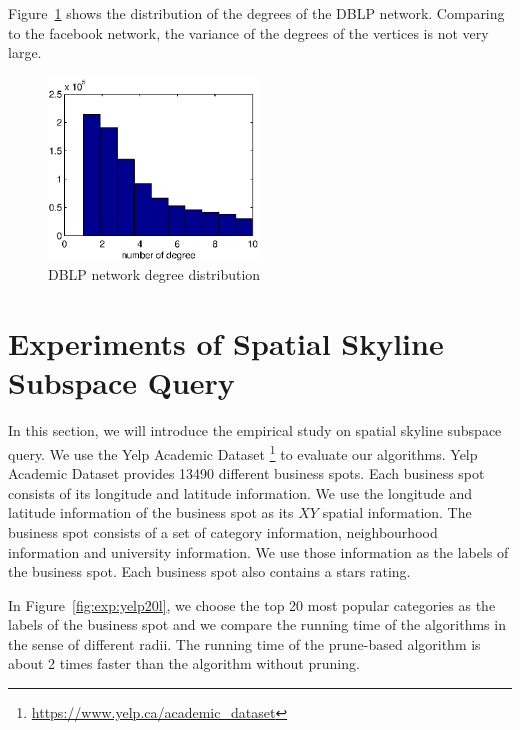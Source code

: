 Figure~\ref{fig:exp:dblp_dis} shows the distribution of the degrees of the DBLP network. Comparing to the facebook network, the variance of the degrees of the vertices is not very large.

\begin{figure}[H]
    \centering
      \includegraphics[width=0.5\textwidth]{figs/DBLP_distri}
    \caption{DBLP network degree distribution}
    \label{fig:exp:dblp_dis}
\end{figure}

\section{Experiments of Spatial Skyline Subspace Query}
\label{ch:exp:spatial}
In this section, we will introduce the empirical study on spatial skyline subspace query. We use the Yelp Academic Dataset \footnote{\url{https://www.yelp.ca/academic_dataset}} to evaluate our algorithms. Yelp Academic Dataset provides 13490 different business spots. Each business spot consists of its longitude and latitude information. We use the longitude and latitude information of the business spot as its $XY$ spatial information. The business spot consists of a set of category information, neighbourhood information and university information. We use those information as the labels of the business spot. Each business spot also contains a stars rating.

In Figure~\ref{fig:exp:yelp20l}, we choose the top 20 most popular categories as the labels of the business spot and we compare the running time of the algorithms in the sense of different radii. The running time of the prune-based algorithm is about 2 times faster than the algorithm without pruning.

